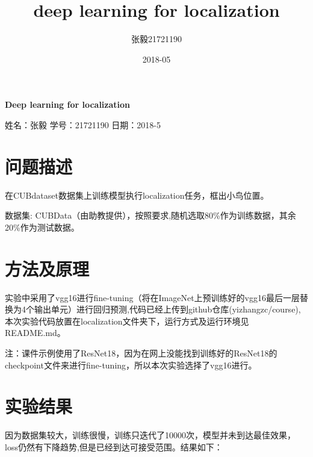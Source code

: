\documentclass[a4paper]{article}
\title{deep learning for localization}
\date{2018-05}
\author{张毅\hspace{1em}21721190}
\begin{document}
    
    \begin{center}
        \doublespacing
        
        \Large \textbf{Deep learning for localization}

        \normalsize 姓名：张毅 \qquad 学号：21721190 \qquad 日期：2018-5
    \end{center}

    \section{问题描述}

    在CUBdataset数据集上训练模型执行localization任务，框出小鸟位置。

    数据集: CUBData（由助教提供），按照要求,随机选取80\%作为训练数据，其余20\%作为测试数据。

    \section{方法及原理}

    实验中采用了vgg16进行fine-tuning（将在ImageNet上预训练好的vgg16最后一层替换为4个输出单元）进行回归预测,代码已经上传到github仓库(yizhangzc/course),本次实验代码放置在localization文件夹下，运行方式及运行环境见README.md。

    注：课件示例使用了ResNet18，因为在网上没能找到训练好的ResNet18的checkpoint文件来进行fine-tuning，所以本次实验选择了vgg16进行。

    \section{实验结果}

    因为数据集较大，训练很慢，训练只迭代了10000次，模型并未到达最佳效果，loss仍然有下降趋势,但是已经到达可接受范围。结果如下：
\end{document}
